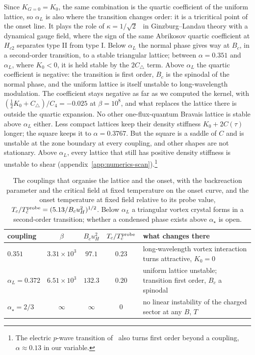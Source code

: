 Since $K_{G=0} = K_0$, the same combination is the quartic coefficient of
the uniform lattice, so $\alpha_L$ is also where the transition changes
order: it is a tricritical point of the onset line. It plays the role of
$\kappa = 1/\sqrt2$~\cite{Abrikosov:1956sx} in Ginzburg--Landau theory with a dynamical gauge
field, where the sign of the same Abrikosov quartic coefficient at
$H_{c2}$ separates type II from type I. Below $\alpha_L$ the normal phase gives way at $B_c$, in a
second-order transition, to a stable triangular lattice; between
$\alpha = 0.351$ and $\alpha_L$, where $K_0 < 0$, it is held stable by the
$2C_\triangle$ term. Above $\alpha_L$
the quartic coefficient is negative: the transition is first order, $B_c$
is the spinodal of the normal phase, and the uniform lattice is itself
unstable to long-wavelength modulation. The coefficient stays negative as
far as we computed the kernel, with
$(\tfrac12K_0 + C_\triangle)/C_4 = -0.025$ at $\beta = 10^8$, and what
replaces the lattice there is outside the quartic expansion. No other
one-flux-quantum Bravais lattice is stable above $\alpha_L$ either. Less
compact lattices keep their density stiffness $K_0 + 2C(\tau)$ longer; the
square keeps it to $\alpha = 0.3767$. But the square is a saddle of $C$ and
is unstable at the zone boundary at every coupling, and other shapes are
not stationary. Above $\alpha_L$, every lattice that still has positive
density stiffness is unstable to shear (appendix~\ref{app:numerics-scan}).\footnote{The electric
$p$-wave transition of~\cite{Ammon:2009xh} also turns first order beyond a
coupling, $\alpha \approx 0.13$ in our variable.}

\begin{table}[t]
\centering
\begin{tabular}{lccc>{\raggedright\arraybackslash}p{}}
\toprule
coupling & $\beta$ & $B_c u_H^2$ & $T_c/T_c^{\rm probe}$ & what changes there \\
\midrule
$0.351$ & $3.31\times10^3$ & $97.1$ & $0.23$ & long-wavelength vortex interaction turns attractive, $K_0 = 0$ \\
$\alpha_L = 0.372$ & $6.51\times10^3$ & $132.3$ & $0.20$ & uniform lattice unstable; transition first order, $B_c$ a spinodal \\
$\alpha_\star = 2/3$ & $\infty$ & $\infty$ & $0$ & no linear instability of the charged sector at any $B$, $T$ \\
\bottomrule
\end{tabular}
\caption{The couplings that organise the lattice and the onset, with the
backreaction parameter and the critical field at fixed temperature on the
onset curve, and the onset temperature at fixed field relative to its probe
value, $T_c/T_c^{\rm probe} = (5.13/B_c u_H^2)^{1/2}$. Below $\alpha_L$ a
triangular vortex crystal forms in a second-order transition; whether a
condensed phase exists above $\alpha_\star$ is open.}
\label{tab:couplings}
\end{table}

